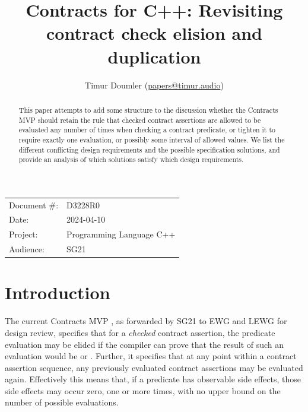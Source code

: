

 \usepackage[bottom]{footmisc} 

 \usepackage{longtable}



\title{Contracts for C++: Revisiting contract check elision and duplication}
\author{ Timur Doumler \small(\href{mailto:papers@timur.audio}{papers@timur.audio}) 
}
\date{}
\maketitle

\begin{tabular}{ll}
Document \#: & D3228R0 \\
Date: &2024-04-10 \\
Project: & Programming Language C++ \\
Audience: & SG21
\end{tabular}

\begin{abstract}
This paper attempts to add some structure to the discussion whether the Contracts MVP should retain the rule that checked contract assertions are allowed to be evaluated any number of times when checking a contract predicate, or tighten it to require exactly one evaluation, or possibly some interval of allowed values. We list the different conflicting design requirements and the possible specification solutions, and provide an analysis of which solutions satisfy which design requirements.
\end{abstract}


\section{Introduction}
\label{sec:intro}

The current Contracts MVP \cite{P2900R6}, as forwarded by SG21 to EWG and LEWG for design review, specifies that for a \emph{checked} contract assertion, the predicate evaluation may be elided if the compiler can prove that the result of such an evaluation would be  or . Further, it specifies that at any point within a contract assertion sequence, any previously evaluated contract assertions may be evaluated again. Effectively this means that, if a predicate has observable side effects, those side effects may occur zero, one or more times, with no upper bound on the number of possible evaluations.

